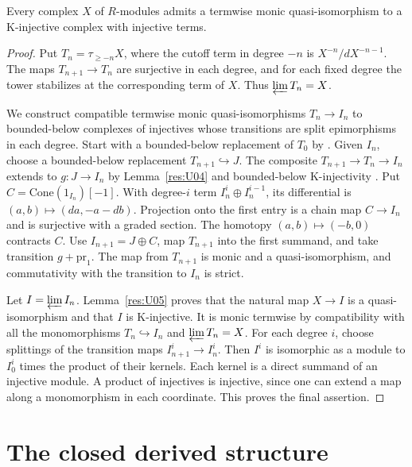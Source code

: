 \begin{theorem}\label{res:U06}
Every complex \(X\) of \(R\)-modules admits a termwise monic
quasi-isomorphism to a K-injective complex with injective terms.
\end{theorem}
\begin{proof}
Put \(T_n=\tau_{\geq -n}X\), where the cutoff term in degree
\(-n\) is \(X^{-n}/d X^{-n-1}\). The maps
\(T_{n+1}\to T_n\) are surjective in each degree, and for
each fixed degree the tower stabilizes at the corresponding
term of \(X\). Thus \(\varprojlim T_n=X\).

We construct compatible termwise monic quasi-isomorphisms
\(T_n\to I_n\) to bounded-below complexes of injectives
whose transitions are split epimorphisms in each degree.
Start with a bounded-below replacement of \(T_0\) by
\cite[R01]{ha-core}. Given \(I_n\), choose a bounded-below
replacement \(T_{n+1}\hookrightarrow J\).
The composite \(T_{n+1}\to T_n\to I_n\) extends to \(g:J\to I_n\)
by Lemma~\ref{res:U04} and bounded-below K-injectivity
\cite[R03]{ha-core}. Put \(C=\mathrm{Cone}(1_{I_n})[-1]\).
With degree-\(i\) term \(I_n^i\oplus I_n^{i-1}\), its differential is
\((a,b)\mapsto(d a,-a-d b)\). Projection onto the first entry is a
chain map \(C\to I_n\) and is surjective with a graded section.
The homotopy \((a,b)\mapsto(-b,0)\) contracts \(C\).
Use \(I_{n+1}=J\oplus C\), map \(T_{n+1}\) into the first summand,
and take transition \(g+\mathrm{pr}_1\).
The map from \(T_{n+1}\) is monic and a quasi-isomorphism,
and commutativity with the transition to \(I_n\) is strict.

Let \(I=\varprojlim I_n\).
Lemma~\ref{res:U05} proves that the natural map \(X\to I\)
is a quasi-isomorphism and that \(I\) is K-injective.
It is monic termwise by compatibility with all the monomorphisms
\(T_n\hookrightarrow I_n\) and \(\varprojlim T_n=X\).
For each degree \(i\), choose splittings of the transition maps
\(I_{n+1}^i\to I_n^i\). Then \(I^i\) is isomorphic as a module to
\(I_0^i\) times the product of their kernels. Each kernel is a direct
summand of an injective module. A product of injectives is injective,
since one can extend a map along a monomorphism in each coordinate.
This proves the final assertion.
\end{proof}

\section{The closed derived structure}

